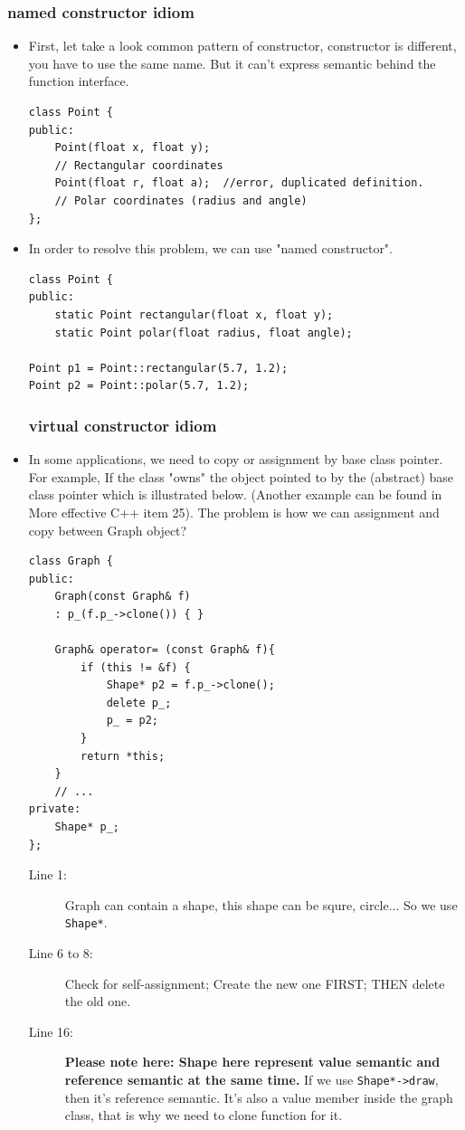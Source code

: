 \documentclass[a4paper,11pt,twoside]{book}
\begin{document}
\subsubsection{named constructor idiom}
\begin{itemize}
	\item First, let take a look common pattern of constructor, constructor is different, you have to use the same name. But it can't express semantic behind the function interface.
\begin{lstlisting}
class Point {
public:
	Point(float x, float y);     
	// Rectangular coordinates
	Point(float r, float a);  //error, duplicated definition. 
	// Polar coordinates (radius and angle)
};
\end{lstlisting}

\item In order to resolve this problem, we can use "named constructor". 
\begin{lstlisting}
class Point {
public:
	static Point rectangular(float x, float y);
	static Point polar(float radius, float angle);
	
Point p1 = Point::rectangular(5.7, 1.2);
Point p2 = Point::polar(5.7, 1.2);
\end{lstlisting}

\subsubsection{virtual constructor idiom}
	
	\item In some applications, we need to copy or assignment by base class pointer. For example, If the class "owns" the object pointed to by the (abstract) base class pointer which is illustrated below. (Another example can be found in More effective C++ item 25). The problem is how we can assignment and copy between Graph object? 
	
\begin{lstlisting}
class Graph {
public:
	Graph(const Graph& f)
	: p_(f.p_->clone()) { }
	
	Graph& operator= (const Graph& f){
		if (this != &f) {              
			Shape* p2 = f.p_->clone();   
			delete p_;                   
			p_ = p2;
		}
		return *this;
	}
	// ...
private:
	Shape* p_; 
};
\end{lstlisting}
\begin{description}
	\item[Line 1:] Graph can contain a shape, this shape can be squre, circle... So we use \texttt{Shape*}. 
	\item[Line 6 to 8:] Check for self-assignment; Create the new one FIRST; THEN delete the old one.
	\item[Line 16:]  \textbf{Please note here: Shape here represent value semantic and reference semantic at the same time.} If we use \texttt{Shape*->draw}, then it's reference semantic. It's also a value member inside the graph class, that is why we need to clone function for it.
\end{description}


\end{itemize}
\end{document}

